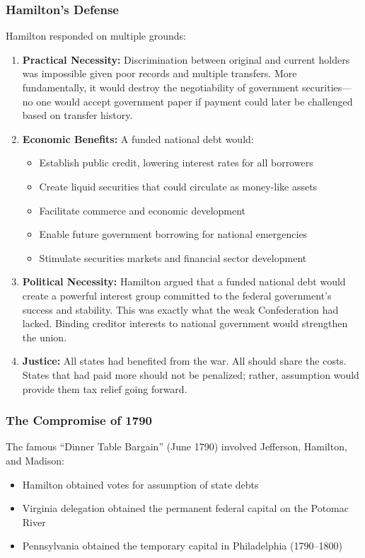 \documentclass[12pt]{article}
\begin{document}
\subsubsection{Hamilton's Defense}

Hamilton responded on multiple grounds:

\begin{enumerate}
\item \textbf{Practical Necessity:} Discrimination between original and current holders was impossible given poor records and multiple transfers. More fundamentally, it would destroy the negotiability of government securities---no one would accept government paper if payment could later be challenged based on transfer history.

\item \textbf{Economic Benefits:} A funded national debt would:
\begin{itemize}
\item Establish public credit, lowering interest rates for all borrowers
\item Create liquid securities that could circulate as money-like assets
\item Facilitate commerce and economic development
\item Enable future government borrowing for national emergencies
\item Stimulate securities markets and financial sector development
\end{itemize}

\item \textbf{Political Necessity:} Hamilton argued that a funded national debt would create a powerful interest group committed to the federal government's success and stability. This was exactly what the weak Confederation had lacked. Binding creditor interests to national government would strengthen the union.

\item \textbf{Justice:} All states had benefited from the war. All should share the costs. States that had paid more should not be penalized; rather, assumption would provide them tax relief going forward.
\end{enumerate}

\subsubsection{The Compromise of 1790}

The famous ``Dinner Table Bargain'' (June 1790) involved Jefferson, Hamilton, and Madison:
\begin{itemize}
\item Hamilton obtained votes for assumption of state debts
\item Virginia delegation obtained the permanent federal capital on the Potomac River
\item Pennsylvania obtained the temporary capital in Philadelphia (1790--1800)
\end{itemize}
\end{document}
